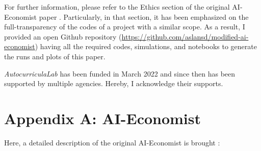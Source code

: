 \documentclass{article}
\begin{document}
For further information, please refer to the Ethics section of the original AI-Economist paper \citep{Zheng2022}. Particularly, in that section, it has been emphasized on the full-transparency of the codes of a project with a similar scope. As a result, I provided an open Github repository (\url{https://github.com/aslansd/modified-ai-economist}) having all the required codes, simulations, and notebooks to generate the runs and plots of this paper.

\begin{ack}
\textit{AutocurriculaLab} has been funded in March 2022 and since then has been supported by multiple agencies. Hereby, I acknowledge their supports.
\end{ack}

\medskip
\small




\newpage

\section{Appendix A: AI-Economist}
Here, a detailed description of the original AI-Economist is brought \citep{Zheng2022}:
\end{document}
